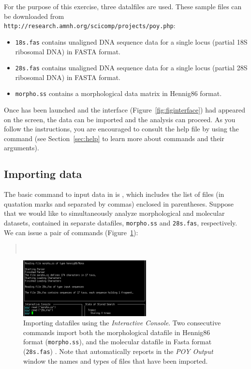 For the purpose of this exercise, three datalfiles are used. These sample files can be downloaded from \\
\texttt{http://research.amnh.org/scicomp/projects/poy.php}:

\begin{itemize}
	\item {\texttt{18s.fas} contains unaligned DNA sequence data for a single locus (partial 18S ribosomal DNA) in FASTA format.}
	\item {\texttt{28s.fas} contains unaligned DNA sequence data for a single locus (partial 28S ribosomal DNA) in FASTA format.}
	\item {\texttt{morpho.ss} contains a morphological data matrix in Hennig86 format.}
\end{itemize}

Once \poy has been launched and the interface (Figure~\ref{fig:figinterface}) had appeared on the screen, the data can be imported and the analysis can proceed. As you follow the instructions, you are encouraged to consult the help file by using the command  (see Section~\ref{sec:help} to learn more about \poy commands and their arguments).

\subsection{Importing data} \label{sec:import}

The basic command to input data in \poy is , which includes the list of files (in quatation marks and separated by commas) enclosed in parentheses. Suppose that we would like to simultaneously analyze morphological and molecular datasets, contained in separate datafiles, \texttt{morpho.ss} and \texttt{28s.fas}, respectively. We can issue a pair of  commands (Figure~\ref{fig:readingexample}):
\begin{quote}
        \\
\end{quote}

\begin{figure}
    \begin{center}
        \includegraphics[width=0.6\textwidth]{figures/reading_example.jpg}
    \end{center}
    \caption{Importing datafiles using the \emph{Interactive Console}. Two consecutive  commands import both the morphological datafile in Hennig86 format (\texttt{morpho.ss}), and the molecular datafile in Fasta format (\texttt{28s.fas}) . Note that \poy automatically reports  in the \emph{POY Output} window the names and types of files that have been imported.}
    \label{fig:readingexample}
\end{figure}

